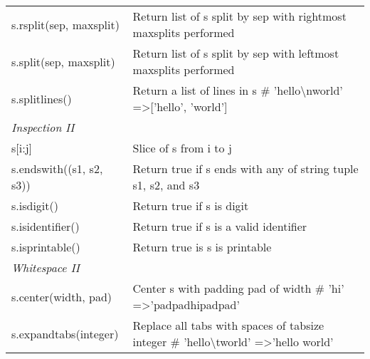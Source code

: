 \documentclass[a4paper,11pt]{book}
\numberwithin{figure}{chapter}
\numberwithin{table}{chapter}
\begin{document}
\begin{appendices}
\begin{table}[!htbp]
\begin{tabular}{lp{12cm}}
s.rsplit(sep, maxsplit)  & Return list of s split by sep with rightmost maxsplits performed                                                                                \\
s.split(sep, maxsplit)   & Return list of s split by sep with leftmost maxsplits performed                                                                                 \\
s.splitlines()           & Return a list of lines in s \# 'hello\textbackslash{}nworld' =\textgreater {[}'hello', 'world'{]}                                               \\ \midrule
\textit{Inspection II}            &                                                                                                                                                 \\ \midrule
s{[}i:j{]}               & Slice of s from i to j                                                                                                                          \\
s.endswith((s1, s2, s3)) & Return true if s ends with any of string tuple s1, s2, and s3                                                                                   \\
s.isdigit()              & Return true if s is digit                                                                                                                       \\
s.isidentifier()         & Return true if s is a valid identifier                                                                                                          \\
s.isprintable()          & Return true is s is printable                                                                                                                   \\ \midrule
\textit{Whitespace II}            &                                                                                                                                                 \\ \midrule
s.center(width, pad)     & Center s with padding pad of width \# 'hi' =\textgreater 'padpadhipadpad'                                                                       \\
s.expandtabs(integer)    & Replace all tabs with spaces of tabsize integer \# 'hello\textbackslash{}tworld' =\textgreater 'hello world'                                    \\

\end{tabular}
\end{table}
\end{appendices}
\end{document}
